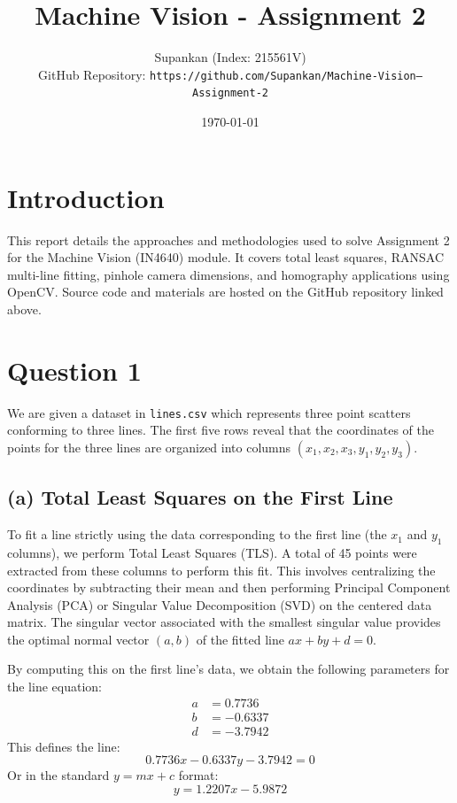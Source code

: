 \documentclass[12pt]{article}
\title{Machine Vision - Assignment 2}
\author{Supankan (Index: 215561V) \\ \small{GitHub Repository: \texttt{https://github.com/Supankan/Machine-Vision---Assignment-2}}}
\date{\today}
\begin{document}
\maketitle

\section*{Introduction}
This report details the approaches and methodologies used to solve Assignment 2 for the Machine Vision (IN4640) module. It covers total least squares, RANSAC multi-line fitting, pinhole camera dimensions, and homography applications using OpenCV. Source code and materials are hosted on the GitHub repository linked above.

\section*{Question 1}

We are given a dataset in \texttt{lines.csv} which represents three point scatters conforming to three lines. The first five rows reveal that the coordinates of the points for the three lines are organized into columns $(x_1, x_2, x_3, y_1, y_2, y_3)$. 

\subsection*{(a) Total Least Squares on the First Line}

To fit a line strictly using the data corresponding to the first line (the $x_1$ and $y_1$ columns), we perform Total Least Squares (TLS). A total of 45 points were extracted from these columns to perform this fit. This involves centralizing the coordinates by subtracting their mean and then performing Principal Component Analysis (PCA) or Singular Value Decomposition (SVD) on the centered data matrix. The singular vector associated with the smallest singular value provides the optimal normal vector $(a, b)$ of the fitted line $ax + by + d = 0$. 

By computing this on the first line's data, we obtain the following parameters for the line equation:
\begin{align*}
    a &= 0.7736 \\
    b &= -0.6337 \\
    d &= -3.7942
\end{align*}
This defines the line:
\[ 0.7736x - 0.6337y - 3.7942 = 0 \]
Or in the standard $y = mx + c$ format:
\[ y = 1.2207x - 5.9872 \]
\end{document}
